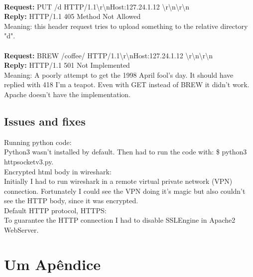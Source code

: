 \documentclass[11pt,a4paper]{report}
\begin{document}
        \\
        \textbf{Request:} PUT /d HTTP/1.1\textbackslash r\textbackslash nHost:127.24.1.12 \textbackslash r\textbackslash n\textbackslash r\textbackslash n \\
        \textbf{Reply:} HTTP/1.1 405 Method Not Allowed \\
        Meaning: this header request tries to upload something to the relative directory "d". \\
        \\
        \textbf{Request:} BREW /coffee/ HTTP/1.1\textbackslash r\textbackslash nHost:127.24.1.12 \textbackslash r\textbackslash n\textbackslash r\textbackslash n \\
        \textbf{Reply:} HTTP/1.1 501 Not Implemented \\
        Meaning: A poorly attempt to get the 1998 April fool's day. It should have replied with 418 I'm a teapot. Even with GET instead of BREW it didn't work. Apache doesn't have the implementation. \\

\section{Issues and fixes}
    Running python code: \\
        Python3 wasn't installed by default. Then had to run the code with: \$ python3 httpsocketv3.py. \\
    Encrypted html body in wireshark: \\
        Initially I had to run wireshark in a remote virtual private network (VPN) connection. Fortunately I could see the VPN doing it's magic but also couldn't see the HTTP body, since it was encrypted. \\
    Default HTTP protocol, HTTPS: \\
        To guarantee the HTTP connection I had to disable SSLEngine in Apache2 WebServer. \\


\renewcommand{\bibname}{Referências bibliográficas}



\appendix
\chapter{Um Apêndice}
\end{document}
